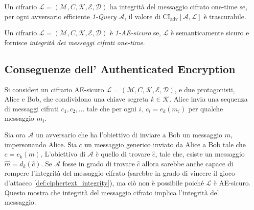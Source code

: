 \begin{definition}
    Un cifrario $\mathcal{L} = (\mathcal{M},C,\mathcal{K},\mathcal{E},\mathcal{D})$ ha integrità del messaggio cifrato one-time se, per ogni avversario efficiente \emph{1-Query} $\mathcal{A}$, il valore di $\text{CI}_\text{adv}[\mathcal{A},\mathcal{L}]$ è trascurabile. 
\end{definition}

\begin{definition}[Sicurezza 1-AE]
    Un cifrario $\mathcal{L} = (\mathcal{M},C,\mathcal{K},\mathcal{E},\mathcal{D})$ è \emph{1-AE-sicuro} se, $\mathcal{L}$ è semanticamente sicuro e fornisce \emph{integrità dei messaggi cifrati one-time}.
\end{definition}

\subsection{Conseguenze dell' Authenticated Encryption}
Si consideri un cifrario AE-sicuro $\mathcal{L} = (\mathcal{M},C,\mathcal{K},\mathcal{E},\mathcal{D})$, e due protagonisti, Alice e Bob, che condividono una chiave segreta $k \in \mathcal{K}$. Alice invia una sequenza di messaggi cifrati $c_1,c_2,\dots$ tale che per ogni $i, \ c_i = e_k(m_i)$ per qualche messaggio $m_i$.

Sia ora $\mathcal{A}$ un avversario che ha l'obiettivo di inviare a Bob un messaggio $m$, impersonando Alice. Sia $c$ un messaggio generico inviato da Alice a Bob tale che $c = e_k(m)$, L'obiettivo di $\mathcal{A}$ è quello di trovare $\hat{c}$, tale che, esiste un messaggio $\hat{m} = d_k(\hat{c})$. Se $\mathcal{A}$ fosse in grado di trovare $\hat{c}$ allora sarebbe anche capace di rompere l'integrità del messaggio cifrato (sarebbe in grado di vincere il gioco d'attacco \ref{def:ciphertext_integrity}), ma ciò non è possibile poiché $\mathcal{L}$ è AE-sicuro. Questo mostra che integrità del messaggio cifrato implica l'integrità del messaggio.

